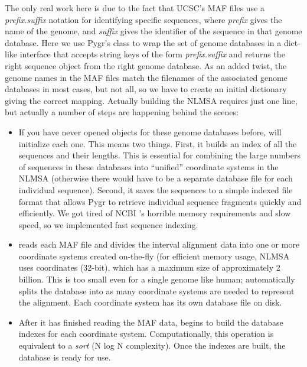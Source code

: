 \documentclass{howto}
\begin{document}
The only real work here is due to the fact that UCSC's MAF files
use a {\em prefix.suffix} notation for identifying specific sequences,
where {\em prefix} gives the name of the genome, and {\em suffix}
gives the identifier of the sequence in that genome database.
Here we use Pygr's  class to wrap the 
set of genome databases in a dict-like interface that accepts
string keys of the form {\em prefix.suffix} and returns the
right sequence object from the right genome database.  As an
added twist, the genome names in the MAF files match the
filenames of the associated genome databases in most cases, but
not all, so we have to create an initial dictionary giving the
correct mapping.  Actually building the NLMSA requires just one
line, but actually a number of steps are happening behind the
scenes:
\begin{itemize}
\item If you have never opened  objects for these genome
databases before,  will initialize each one.  This means
two things.  First, it builds an index of all the sequences and their 
lengths.  This is essential for combining the
large numbers of sequences in these databases into 
``unified'' coordinate systems in the NLMSA (otherwise there would
have to be a separate database file for each individual sequence).
Second, it saves the sequences to a simple indexed file format that
allows Pygr to retrieve individual sequence fragments quickly and
efficiently.  We got tired of NCBI 's horrible
memory requirements and slow speed, so we implemented fast sequence
indexing.

\item {} reads each MAF file and divides the interval
alignment data into one or more coordinate systems created 
on-the-fly (for efficient memory usage, NLMSA uses 
coordinates (32-bit), which has a maximum size of approximately
2 billion.  This is too small even for a single genome like human;
 automatically splits the database into as many
coordinate systems are needed to represent the alignment.
Each coordinate system has its own database file on disk.

\item After it has finished reading the MAF data, 
begins to build the database indexes for each coordinate 
system.  Computationally, this operation is equivalent to
a {\em sort} (N log N complexity).  Once the indexes are built, the database is
ready for use.
\end{itemize}
	
\end{document}
